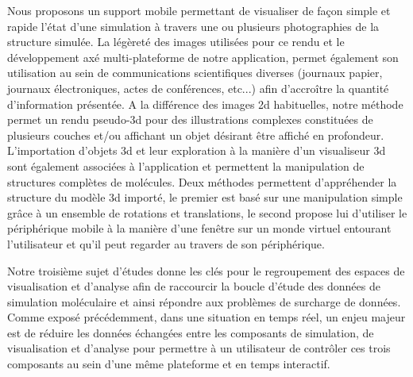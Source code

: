 Nous proposons un support mobile permettant de visualiser de façon simple et rapide l'état d'une simulation à travers une ou plusieurs photographies de la structure simulée. La légèreté des images utilisées pour ce rendu et le développement axé multi-plateforme de notre application, permet également son utilisation au sein de communications scientifiques diverses (journaux papier, journaux électroniques, actes de conférences, etc...) afin d’accroître la quantité d'information présentée. A la différence des images 2d habituelles, notre méthode permet un rendu pseudo-3d pour des illustrations complexes constituées de plusieurs couches et/ou affichant un objet désirant être affiché en profondeur. 
L'importation d'objets 3d et leur exploration à la manière d'un visualiseur 3d sont également associées à l'application et permettent la manipulation de structures complètes de molécules. Deux méthodes permettent d'appréhender la structure du modèle 3d importé, le premier est basé sur une manipulation simple grâce à un ensemble de rotations et translations, le second propose lui d'utiliser le périphérique mobile à la manière d'une fenêtre sur un monde virtuel entourant l'utilisateur et qu'il peut regarder au travers de son périphérique.


Notre troisième sujet d'études donne les clés pour le regroupement des espaces de visualisation et d'analyse afin de raccourcir la boucle d'étude des données de simulation moléculaire et ainsi répondre aux problèmes de surcharge de données. Comme exposé précédemment, dans une situation en temps réel, un enjeu majeur est de réduire les données échangées entre les composants de simulation, de visualisation et d'analyse pour permettre à un utilisateur de contrôler ces trois composants au sein d'une même plateforme et en temps interactif.

